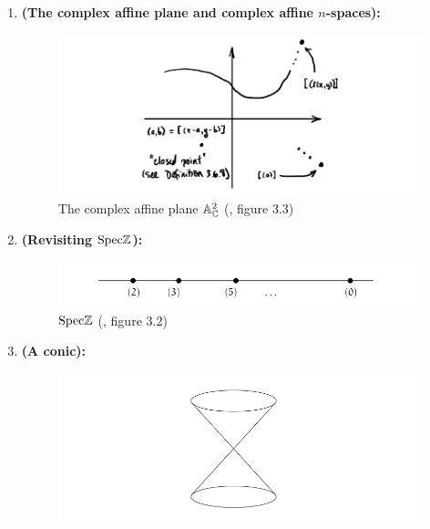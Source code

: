                 \begin{example}
                    \noindent
                    \begin{enumerate}
                        \item \textbf{(The complex affine plane and complex affine $n$-spaces):}
                            \begin{figure}[H]
                                \centering
                                \includegraphics[width=\linewidth,height=\textheight,keepaspectratio]{Figures/complex affine plane.png}
                                \caption{The complex affine plane $\mathbb{A}^2_{\mathbb{C}}$ (\cite{risingsea}, figure 3.3)}
                                \label{fig: complex_affine_plane}
                            \end{figure}
                        \item \textbf{(Revisiting $\mathrm{Spec} \mathbb{Z}$):}
                            \begin{figure}[H]
                                \centering
                                \includegraphics[width=\linewidth,height=\textheight,keepaspectratio]{Figures/Spec Z.png}
                                \caption{$\mathrm{Spec} \mathbb{Z}$ (\cite{risingsea}, figure 3.2)}
                                \label{fig: Spec_Z}
                            \end{figure}
                        \item \textbf{(A conic):}
                            \begin{figure}[H]
                                \centering
                                \includegraphics[width=\linewidth,height=\textheight,keepaspectratio]{Figures/conic.png}

\end{figure}
\end{enumerate}
\end{example}
